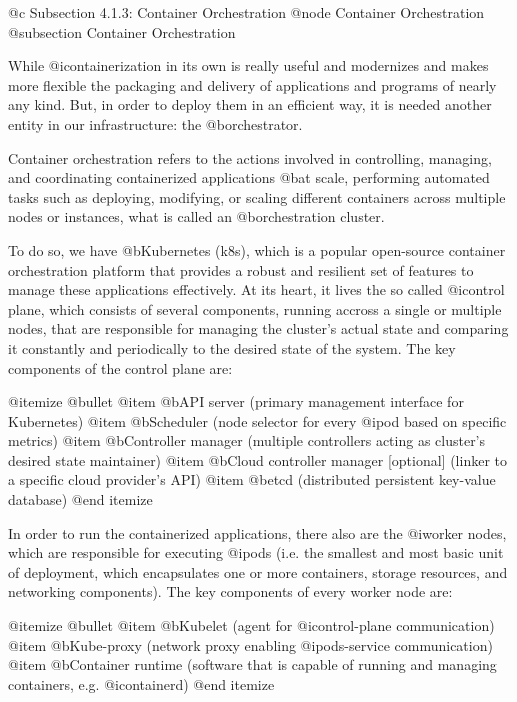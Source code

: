 @c Subsection 4.1.3: Container Orchestration
@node Container Orchestration
@subsection Container Orchestration

While @i{containerization} in its own is really useful and modernizes and makes more flexible the packaging and delivery of applications and programs of nearly any kind. But, in order to deploy them in an efficient way, it is needed another entity in our infrastructure: the @b{orchestrator}.

Container orchestration refers to the actions involved in controlling, managing, and coordinating containerized applications @b{at scale}, performing automated tasks such as deploying, modifying, or scaling different containers across multiple nodes or instances, what is called an @b{orchestration cluster}.

To do so, we have @b{Kubernetes (k8s)}, which is a popular open-source container orchestration platform that provides a robust and resilient set of features to manage these applications effectively. At its heart, it lives the so called @i{control plane}, which consists of several components, running accross a single or multiple nodes, that are responsible for managing the cluster's actual state and comparing it constantly and periodically to the desired state of the system. The key components of the control plane are:

@itemize @bullet
@item @b{API server} (primary management interface for Kubernetes)
@item @b{Scheduler} (node selector for every @i{pod} based on specific metrics)
@item @b{Controller manager} (multiple controllers acting as cluster's desired state maintainer)
@item @b{Cloud controller manager [optional]} (linker to a specific cloud provider's API)
@item @b{etcd} (distributed persistent key-value database)
@end itemize

In order to run the containerized applications, there also are the @i{worker nodes}, which are responsible for executing @i{pods} (i.e. the smallest and most basic unit of deployment, which encapsulates one or more containers, storage resources, and networking components). The key components of every worker node are:

@itemize @bullet
@item @b{Kubelet} (agent for @i{control-plane} communication)
@item @b{Kube-proxy} (network proxy enabling @i{pods-service} communication)
@item @b{Container runtime} (software that is capable of running and managing containers, e.g. @i{containerd})
@end itemize

